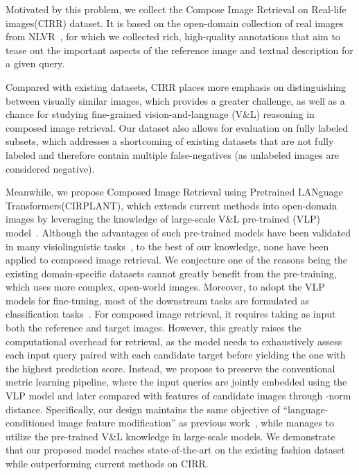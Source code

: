 \documentclass[10pt,twocolumn,letterpaper]{article}
\newcommand{\dstname}{CIRR\xspace}
\newcommand{\dstnamefull}{Compose Image Retrieval on Real-life images\xspace}
\newcommand{\modelnamefull}{Composed Image Retrieval using Pretrained LANguage Transformers\xspace}
\newcommand{\modelname}{CIRPLANT\xspace}
\begin{document}
Motivated by this problem, we collect the \dstnamefull (\dstname) dataset. It is based on the open-domain collection of real images from NLVR~\cite{Suhr_2019_nlvr2}, for which we collected rich, high-quality annotations that aim to tease out the important aspects of the reference image and textual description for a given query.

Compared with existing datasets, \dstname places more emphasis on distinguishing between visually similar images, which provides a greater challenge, as well as a chance for studying fine-grained vision-and-language (V\&L) reasoning in composed image retrieval. 
Our dataset also allows for evaluation on fully labeled subsets, which addresses a shortcoming of existing datasets that are not fully labeled and therefore contain multiple false-negatives (as unlabeled images are considered negative).

Meanwhile, we propose \modelnamefull (\modelname), which extends current methods into open-domain images by leveraging the knowledge of large-scale V\&L pre-trained (VLP) model~\cite{oscar}. 
Although the advantages of such pre-trained models have been validated in many visiolinguistic tasks~\cite{oscar,vilbert,chen2020uniter}, to the best of our knowledge, none have been applied to composed image retrieval. We conjecture one of the reasons being the existing domain-specific datasets cannot greatly benefit from the pre-training, which uses more complex, open-world images. 
Moreover, to adopt the VLP models for fine-tuning, most of the downstream tasks are formulated as classification tasks~\cite{oscar,chen2020uniter}. For composed image retrieval, it requires taking as input both the reference and target images. However, this greatly raises the computational overhead for retrieval, as the model needs to exhaustively assess each input query paired with each candidate target before yielding the one with the highest prediction score. 
Instead, we propose to preserve the conventional metric learning pipeline, where the input queries are jointly embedded using the VLP model and later compared with features of candidate images through -norm distance. 
Specifically, our design maintains the same objective of ``language-conditioned image feature modification'' as previous work~\cite{Vo_2019_tirg,chen2020image_val,dodds2020modality_maaf}, while manages to utilize the pre-trained V\&L knowledge in large-scale models.
We demonstrate that our proposed model reaches state-of-the-art on the existing fashion dataset while outperforming current methods on \dstname.
\end{document}
